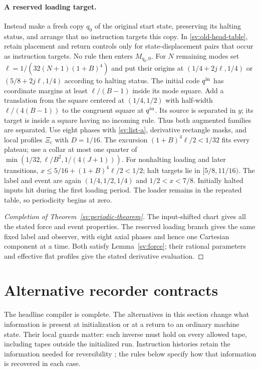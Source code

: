 \paragraph{A reserved loading target.}
Instead make a fresh copy $q_0$ of the original start state, preserving
its halting status, and arrange that no instruction targets this copy.
In \eqref{sv:old-head-table}, retain placement and return controls only
for state-displacement pairs that occur as instruction targets.
No rule then enters $M_{q_0,0}$.  For $N$ remaining modes set
$\ell=1/(32(N+1)(1+B)^4)$ and put their origins at
$(1/4+2j\ell,1/4)$ or $(5/8+2j\ell,1/4)$ according to
halting status.  The initial code $q^{\rm in}$ has coordinate margins
at least $\ell/(B-1)$ inside its mode square.  Add a translation
from the square centered at $(1/4,1/2)$ with half-width
$\ell/(4(B-1))$ to the congruent square at $q^{\rm in}$.
Its source is separated in $y$; its target is inside a square having
no incoming rule.  Thus both augmented families are separated.
Use eight phases with \eqref{sv:list-a}, derivative rectangle masks,
and local profiles $\Xi_c$ with $D=1/16$.  The excursion
$(1+B)^4\ell/2<1/32$ fits every plateau; use a collar at most
one quarter of $\min(1/32,\ell/B^2,1/(4(J+1)))$.
For nonhalting loading and later transitions,
$x\le5/16+(1+B)^4\ell/2<1/2$; halt targets lie in
$[5/8,11/16)$.  The label and event are again
$(1/4,1/2,1/4)$ and $1/2<x<7/8$.  Initially halted inputs
hit during the first loading period.  The loader remains in the repeated
table, so periodicity begins at zero.

\begin{proof}[Completion of Theorem~\ref{sv:periodic-theorem}]
The input-shifted chart gives all the stated force and event properties.
The reserved loading branch gives the same fixed label and observer,
with eight axial phases and hence one Cartesian component at a time.
Both satisfy Lemma~\ref{sv:force}; their rational parameters and
effective flat profiles give the stated derivative evaluation.
\end{proof}

\section{Alternative recorder contracts}
\label{sv:recorders}

The headline compiler is complete. The alternatives in this section
change what information is present at initialization or at a return to
an ordinary machine state. Their local guards matter: each inverse must
hold on every allowed tape, including tapes outside the initialized run.
Instruction histories retain the information needed for reversibility
\cite{Bennett1973}; the rules below specify how that information is
recovered in each case.

